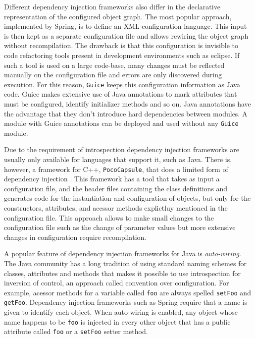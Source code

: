 Different dependency injection frameworks also differ in the declarative representation of the configured object graph.
The most popular approach, implemented by Spring, is to define an XML configuration language. This input is then
kept as a separate configuration file and allows rewiring the object graph without recompilation. The drawback
is that this configuration is invisible to code refactoring \cite{Fowler3} tools present in development environments such as eclipse.
If such a tool is used on a large code-base, many changes must be reflected manually on the configuration file and
errors are only discovered during execution. For this reason, \texttt{Guice} keeps this configuration information as Java code.
Guice makes extensive use of Java annotations to mark attributes that must be configured, identify initializer methods
and so on. Java annotations have the advantage that they don't introduce hard dependencies between modules.
A module with Guice annotations can be deployed and used without any \texttt{Guice} module.

Due to the requirement of introspection dependency injection frameworks are usually only available for languages
that support it, such as Java. There is, however, a framework for C++, \texttt{PocoCapsule}, that does a limited form of
dependency injection \cite{PocoCapsule}. This framework has a tool that takes as input a configuration file, and
the header files containing the class definitions and generates code for the instantiation and configuration
of objects, but only for the constructors, attributes, and acessor methods explictluy mentioned in the configuration
file. This approach allows to make small changes to the configuration file such as the change of parameter values
but more extensive changes in configuration require recompilation.

A popular feature of dependency injection frameworks for Java is \emph{auto-wiring}. The Java community has a
long tradition of using standard naming schemes for classes, attributes and methods that makes it possible to
use introspection for inversion of control, an approach called convention over configuration. For example,
acessor methods for a variable called \texttt{foo} are always spelled \texttt{setFoo} and \texttt{getFoo}.
Dependency injection frameworks such as Spring require that a name is given to identify each object. When
auto-wiring is enabled, any object whose name happens to be \texttt{foo} is injected in every other object
that has a public attribute called \texttt{foo} or a \texttt{setFoo} setter method.

